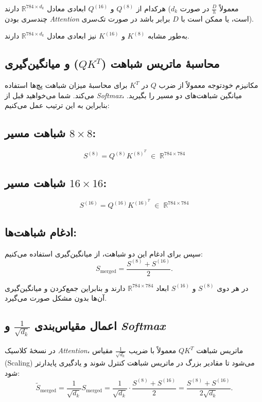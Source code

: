 هرکدام از \(Q^{(8)}\) و \(Q^{(16)}\) ابعادی معادل \(\mathbb{R}^{784 \times d_k}\) دارند (\(d_k\) معمولاً \(\frac{D}{h}\) در صورت چندسری بودن \textit{Attention} است، یا ممکن است با \(D\) برابر باشد در صورت تک‌سری).

به‌طور مشابه \(K^{(8)}\) و \(K^{(16)}\) نیز ابعادی معادل \(\mathbb{R}^{784 \times d_k}\) دارند.

\subsection{محاسبهٔ ماتریس شباهت (\(QK^T\)) و میانگین‌گیری}

مکانیزم خودتوجه  معمولاً از ضرب \(Q\) در \(K^T\) برای محاسبهٔ میزان شباهت پچ‌ها استفاده می‌کند. شما می‌خواهید قبل از \textit{Softmax}، میانگین شباهت‌های دو مسیر را بگیرید. بنابراین به این ترتیب عمل می‌کنیم:

\subsection*{شباهت مسیر $8 \times 8$:}
\[
S^{(8)} = Q^{(8)} K^{(8)^T} \; \in \; \mathbb{R}^{784 \times 784}
\]

\subsection*{شباهت مسیر $16 \times 16$:}
\[
S^{(16)} = Q^{(16)} K^{(16)^T} \; \in \; \mathbb{R}^{784 \times 784}
\]

\subsection*{ادغام شباهت‌ها:}
سپس برای ادغام این دو شباهت، از میانگین‌گیری استفاده می‌کنیم:
\begin{equation}
	S_{\text{merged}} = \frac{S^{(8)} + S^{(16)}}{2}.
\end{equation}


در هر دوی \(S^{(8)}\) و \(S^{(16)}\) ابعاد \(\mathbb{R}^{784 \times 784}\) دارند و بنابراین جمع‌کردن و میانگین‌گیری آن‌ها بدون مشکل صورت می‌گیرد.

\subsection{اعمال مقیاس‌بندی \( \frac{1}{\sqrt{d_k}} \) و  \textit{Softmax}}

در نسخهٔ کلاسیک \textit{Attention}، ماتریس شباهت \( QK^T \) معمولاً با ضریب \( \frac{1}{\sqrt{d_k}} \) مقیاس (Scaling) می‌شود تا مقادیر بزرگ در ماتریس شباهت کنترل شوند و یادگیری پایدارتر شود:
\[
\tilde{S}_{\text{merged}} = \frac{1}{\sqrt{d_k}} S_{\text{merged}} = \frac{1}{\sqrt{d_k}} \cdot \frac{S^{(8)} + S^{(16)}}{2} = \frac{S^{(8)} + S^{(16)}}{2 \sqrt{d_k}}.
\]

